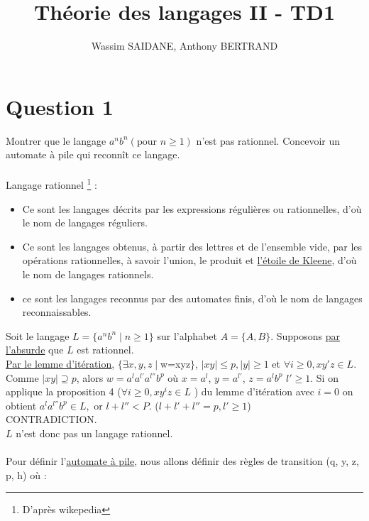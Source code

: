 \documentclass{article}
\title{Théorie des langages II - TD1}
\author{Wassim SAIDANE, Anthony BERTRAND}
\date{}
\begin{document}
    \maketitle
    \section*{Question 1}
    Montrer  que  le  langage $a^nb^n(\text{pour } n \ge 1)$  n’est  pas  rationnel.  Concevoir  un automate à pile qui reconnît ce langage. \\
    \\
    Langage rationnel \footnote{D'après wikepedia} : \\
    \begin{itemize}
        \item Ce sont les langages décrits par les expressions régulières ou rationnelles, d'où le nom de langages réguliers.
        \item Ce sont les langages obtenus, à partir des lettres et de l'ensemble vide, par les opérations rationnelles, à savoir l'union, le produit et \href{https://fr.wikipedia.org/wiki/Étoile_de_Kleene}{l'étoile de Kleene}, d'où le nom de langages rationnels.
        \item ce sont les langages reconnus par des automates finis, d'où le nom de langages reconnaissables.
    \end{itemize} 
    Soit le langage $L=\{a^nb^n \mid n \ge 1\}$ sur l'alphabet $A=\{A,B\}$. Supposons \underline{par l'absurde} que $L$ est rationnel. \\
    \href{https://fr.wikipedia.org/wiki/Lemme_de_l%27étoile}{\underline{Par le lemme d'itération}}, $\{\exists x,y,z \mid $w=xyz$\}$, $\mid xy \mid \le p, \mid y \mid \ge 1$ 
    et $\forall i \ge 0, xy'z \in L$. \\
    Comme $\mid xy \mid \supseteq p$, alors $w=a^la^{l'}a^{l''}b^p$ où $x=a^l$, $y=a^{l'}$, $z=a^lb^p$ $l' \ge 1$. Si on applique la proposition 4 ($\forall i \ge 0, xy^iz \in L$ )
    du lemme d'itération avec $i=0$ on obtient $a^la^{l''}b^p \in L,$ or $l+l'' < P$. ($l+l'+l''=p, l' \ge 1$) \\
    CONTRADICTION. \\
    $L$ n'est donc pas un langage rationnel. \\
    \\
    Pour définir l'\href{https://fr.wikipedia.org/wiki/Automate_à_pile#Un_exemple}{automate à pile}, nous allons définir des règles de transition (q, y, z, p, h) où :
\end{document}
